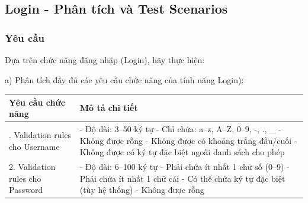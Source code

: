 \documentclass[a4paper,12pt]{article}
\begin{document}
\subsection{Login - Phân tích và Test Scenarios}

\subsubsection{Yêu cầu}

Dựa trên chức năng đăng nhập (Login), hãy thực hiện:

a) Phân tích đầy đủ các yêu cầu chức năng của tính năng Login):
\begin{table}[H]
\centering
\begin{tabularx}{\textwidth}{|>{\raggedright\arraybackslash}p{3.5cm}|>{\raggedright\arraybackslash}X|}

\hline
\textbf{Yêu cầu chức năng} & \textbf{Mô tả chi tiết} \\ \hline

1. Validation rules cho Username &
- Độ dài: 3–50 ký tự \newline
- Chỉ chứa: a–z, A–Z, 0–9, -, ., \_ \newline
- Không được rỗng \newline
- Không được có khoảng trắng đầu/cuối \newline
- Không được có ký tự đặc biệt ngoài danh sách cho phép \\ \hline

2. Validation rules cho Password &
- Độ dài: 6–100 ký tự \newline
- Phải chứa ít nhất 1 chữ số (0–9) \newline
- Phải chứa ít nhất 1 chữ cái \newline
- Có thể chứa ký tự đặc biệt (tùy hệ thống) \newline
- Không được rỗng \\ \hline


\end{tabularx}
\end{table}
\end{document}
